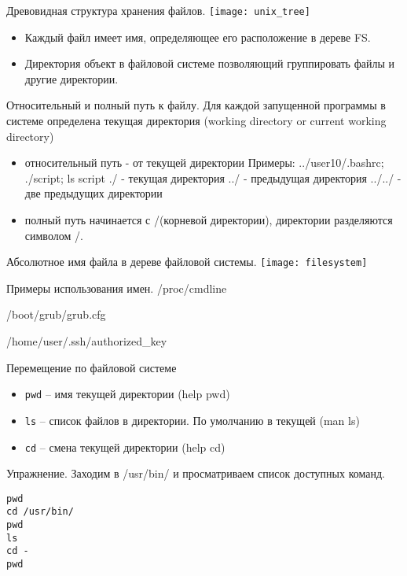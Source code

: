 
\begin{frame}{Древовидная структура хранения файлов.}
\texttt{[image: unix\_tree]} 
  \begin{itemize}
    \item Каждый файл имеет \alert{имя}, определяющее его расположение в дереве FS.
    \item \alert{Директория} объект в файловой системе позволяющий группировать файлы и другие директории.
  \end{itemize}
\end{frame}

\begin{frame}[fragile]{Относительный и полный путь к файлу.}
 Для каждой запущенной программы в системе определена \alert{текущая директория} (working directory or current working directory) 
  \begin{itemize}
    \item \alert{относительный путь} - от текущей директории \newline
      Примеры: ../user10/.bashrc; ./script; ls script
        \alert{./} - текущая директория \newline 
        \alert{../} - предыдущая директория \newline 
        \alert{../../} - две предыдущих директории 
    \item \alert{полный путь} начинается с \alert{/}(корневой директории), директории разделяются символом \alert{/}. \newline
  \end{itemize}
\end{frame}


\begin{frame}{Абсолютное имя файла в дереве файловой системы.}
\texttt{[image: filesystem]} 
\end{frame}

\begin{frame}{Примеры использования имен.}
        /proc/cmdline

        /boot/grub/grub.cfg

        /home/user/.ssh/authorized\_key \newline 
\end{frame}

\begin{frame}[fragile]{Перемещение по файловой системе}
      \begin{itemize}
		  \item {\tt pwd} -- имя текущей директории (help pwd)
		  \item {\tt ls} -- список файлов в директории. По умолчанию в текущей (man ls)
		  \item {\tt cd} -- смена текущей директории (help cd)
      \end{itemize}
      \begin{block}{Упражнение. Заходим в /usr/bin/ и просматриваем список доступных команд.}
\begin{lstlisting}
pwd
cd /usr/bin/
pwd
ls
cd -
pwd
\end{lstlisting}
      \end{block}
\end{frame}



